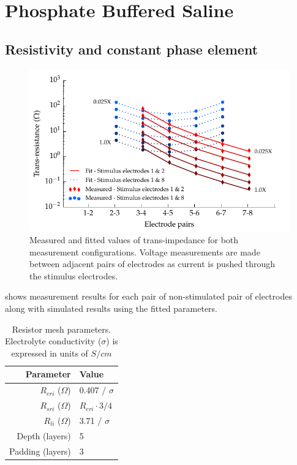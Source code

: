 
\section{Phosphate Buffered Saline}
    \subsection{Resistivity and constant phase element}

        \begin{figure}
          \centering
          \includegraphics{content/pt2/07-InterfaceModel/graphics/graph_transimpedance_pbs}
          \caption{\label{fig:pt2-graph_transimpedance_pbs}Measured and fitted values of trans-impedance for both measurement configurations. Voltage measurements are made between adjacent pairs of electrodes as current is pushed through the stimulus electrodes.}
        \end{figure}

         shows measurement results for each pair of non-stimulated pair of electrodes along with simulated results using the fitted parameters.


        \begin{table}
          \centering
          \begin{tabular}{r | l}
            Parameter & Value \\
            \hline
            $R_{eri}$ ($\Omega$)& 0.407 / $\sigma$\\
            $R_{sri}$ ($\Omega$)& $R_{eri}\cdot 3/4$\\
            $R_{li}$ ($\Omega$)& 3.71 / $\sigma$ \\
            Depth (layers) & 5 \\
            Padding (layers) & 3 \\
          \end{tabular}
          \caption{\label{tab:RESparams}Resistor mesh parameters. Electrolyte conductivity ($\sigma$) is expressed in units of $S / cm$}
        \end{table}
